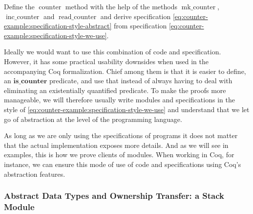 \begin{exercise}
  Define the $\operatorname{counter}$ method with the help of the methods $\operatorname{mk\_counter}$, $\operatorname{inc\_counter}$ and $\operatorname{read\_counter}$ and derive specification \eqref{eq:counter-example:specification-style-abstract} from specification \eqref{eq:counter-example:specification-style-we-use}.
\end{exercise}


Ideally we would want to use this combination of code and specification.  However, it
has some practical usability downsides  when used in the
accompanying Coq formalization.  Chief among them is that it is easier
to define, \eg{} an $\mathbf{is\_counter}$ predicate, and use that
instead of always having to deal with eliminating an existentially
quantified predicate.  To make the proofs more manageable, 
we will therefore usually write modules
and specifications in the style of
\eqref{eq:counter-example:specification-style-we-use} and understand
that we let go of abstraction at the level of the programming language.

As long as we are only using the specifications of programs it does not matter that the actual implementation exposes more details.
And as we will see in examples, this is how we prove clients of modules.
When working in Coq, for instance, we can ensure this mode of use of code and specifications using Coq's abstraction features.

\subsubsection{Abstract Data Types and Ownership Transfer: a Stack Module}
\label{sec:ownership-transfer}

